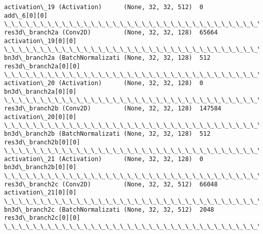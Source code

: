 \documentclass[11pt]{article}
\begin{document}
\begin{Verbatim}[commandchars=\\\{\}]
activation\_19 (Activation)      (None, 32, 32, 512)  0           add\_6[0][0]                      
\_\_\_\_\_\_\_\_\_\_\_\_\_\_\_\_\_\_\_\_\_\_\_\_\_\_\_\_\_\_\_\_\_\_\_\_\_\_\_\_\_\_\_\_\_\_\_\_\_\_\_\_\_\_\_\_\_\_\_\_\_\_\_\_\_\_\_\_\_\_\_\_\_\_\_\_\_\_\_\_\_\_\_\_\_\_\_\_\_\_\_\_\_\_\_\_\_\_
res3d\_branch2a (Conv2D)         (None, 32, 32, 128)  65664       activation\_19[0][0]              
\_\_\_\_\_\_\_\_\_\_\_\_\_\_\_\_\_\_\_\_\_\_\_\_\_\_\_\_\_\_\_\_\_\_\_\_\_\_\_\_\_\_\_\_\_\_\_\_\_\_\_\_\_\_\_\_\_\_\_\_\_\_\_\_\_\_\_\_\_\_\_\_\_\_\_\_\_\_\_\_\_\_\_\_\_\_\_\_\_\_\_\_\_\_\_\_\_\_
bn3d\_branch2a (BatchNormalizati (None, 32, 32, 128)  512         res3d\_branch2a[0][0]             
\_\_\_\_\_\_\_\_\_\_\_\_\_\_\_\_\_\_\_\_\_\_\_\_\_\_\_\_\_\_\_\_\_\_\_\_\_\_\_\_\_\_\_\_\_\_\_\_\_\_\_\_\_\_\_\_\_\_\_\_\_\_\_\_\_\_\_\_\_\_\_\_\_\_\_\_\_\_\_\_\_\_\_\_\_\_\_\_\_\_\_\_\_\_\_\_\_\_
activation\_20 (Activation)      (None, 32, 32, 128)  0           bn3d\_branch2a[0][0]              
\_\_\_\_\_\_\_\_\_\_\_\_\_\_\_\_\_\_\_\_\_\_\_\_\_\_\_\_\_\_\_\_\_\_\_\_\_\_\_\_\_\_\_\_\_\_\_\_\_\_\_\_\_\_\_\_\_\_\_\_\_\_\_\_\_\_\_\_\_\_\_\_\_\_\_\_\_\_\_\_\_\_\_\_\_\_\_\_\_\_\_\_\_\_\_\_\_\_
res3d\_branch2b (Conv2D)         (None, 32, 32, 128)  147584      activation\_20[0][0]              
\_\_\_\_\_\_\_\_\_\_\_\_\_\_\_\_\_\_\_\_\_\_\_\_\_\_\_\_\_\_\_\_\_\_\_\_\_\_\_\_\_\_\_\_\_\_\_\_\_\_\_\_\_\_\_\_\_\_\_\_\_\_\_\_\_\_\_\_\_\_\_\_\_\_\_\_\_\_\_\_\_\_\_\_\_\_\_\_\_\_\_\_\_\_\_\_\_\_
bn3d\_branch2b (BatchNormalizati (None, 32, 32, 128)  512         res3d\_branch2b[0][0]             
\_\_\_\_\_\_\_\_\_\_\_\_\_\_\_\_\_\_\_\_\_\_\_\_\_\_\_\_\_\_\_\_\_\_\_\_\_\_\_\_\_\_\_\_\_\_\_\_\_\_\_\_\_\_\_\_\_\_\_\_\_\_\_\_\_\_\_\_\_\_\_\_\_\_\_\_\_\_\_\_\_\_\_\_\_\_\_\_\_\_\_\_\_\_\_\_\_\_
activation\_21 (Activation)      (None, 32, 32, 128)  0           bn3d\_branch2b[0][0]              
\_\_\_\_\_\_\_\_\_\_\_\_\_\_\_\_\_\_\_\_\_\_\_\_\_\_\_\_\_\_\_\_\_\_\_\_\_\_\_\_\_\_\_\_\_\_\_\_\_\_\_\_\_\_\_\_\_\_\_\_\_\_\_\_\_\_\_\_\_\_\_\_\_\_\_\_\_\_\_\_\_\_\_\_\_\_\_\_\_\_\_\_\_\_\_\_\_\_
res3d\_branch2c (Conv2D)         (None, 32, 32, 512)  66048       activation\_21[0][0]              
\_\_\_\_\_\_\_\_\_\_\_\_\_\_\_\_\_\_\_\_\_\_\_\_\_\_\_\_\_\_\_\_\_\_\_\_\_\_\_\_\_\_\_\_\_\_\_\_\_\_\_\_\_\_\_\_\_\_\_\_\_\_\_\_\_\_\_\_\_\_\_\_\_\_\_\_\_\_\_\_\_\_\_\_\_\_\_\_\_\_\_\_\_\_\_\_\_\_
bn3d\_branch2c (BatchNormalizati (None, 32, 32, 512)  2048        res3d\_branch2c[0][0]             
\_\_\_\_\_\_\_\_\_\_\_\_\_\_\_\_\_\_\_\_\_\_\_\_\_\_\_\_\_\_\_\_\_\_\_\_\_\_\_\_\_\_\_\_\_\_\_\_\_\_\_\_\_\_\_\_\_\_\_\_\_\_\_\_\_\_\_\_\_\_\_\_\_\_\_\_\_\_\_\_\_\_\_\_\_\_\_\_\_\_\_\_\_\_\_\_\_\_

\end{Verbatim}
\end{document}
